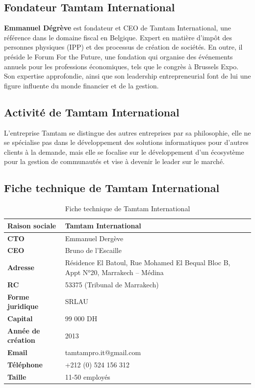 \begin{itemize}
\subsection{Fondateur Tamtam International}

\textbf{Emmanuel Dégrève} est fondateur et CEO de Tamtam International, une référence dans le domaine fiscal en Belgique. Expert en matière d'impôt des personnes physiques (IPP) et des processus de création de sociétés. En outre, il préside le Forum For the Future, une fondation qui organise des événements annuels pour les professions économiques, tels que le congrès à Brussels Expo. Son expertise approfondie, ainsi que son leadership entrepreneurial font de lui une figure influente du monde financier et de la gestion.

\subsection{Activité de Tamtam International}

L'entreprise Tamtam se distingue des autres entreprises par sa philosophie, elle ne se spécialise pas dans le développement des solutions informatiques pour d'autres clients à la demande, mais elle se focalise sur le développement d'un écosystème pour la gestion de communautés et vise à devenir le leader sur le marché.

\subsection{Fiche technique de Tamtam International}

\begin{table}[H]
\centering
\begin{tabular}{|l|l|}
\hline
\textbf{Raison sociale} & Tamtam International \\
\hline
\textbf{CTO} & Emmanuel Dergève \\
\hline
\textbf{CEO} & Bruno de l'Escaille \\
\hline
\textbf{Adresse} & Résidence El Batoul, Rue Mohamed El Bequal Bloc B, Appt N°20, Marrakech – Médina \\
\hline
\textbf{RC} & 53375 (Tribunal de Marrakech) \\
\hline
\textbf{Forme juridique} & SRLAU \\
\hline
\textbf{Capital} & 99 000 DH \\
\hline
\textbf{Année de création} & 2013 \\
\hline
\textbf{Email} & tamtampro.it@gmail.com \\
\hline
\textbf{Téléphone} & +212 (0) 524 156 312 \\
\hline
\textbf{Taille} & 11-50 employés \\
\hline
\end{tabular}
\caption{Fiche technique de Tamtam International}
\end{table}


\end{itemize}
